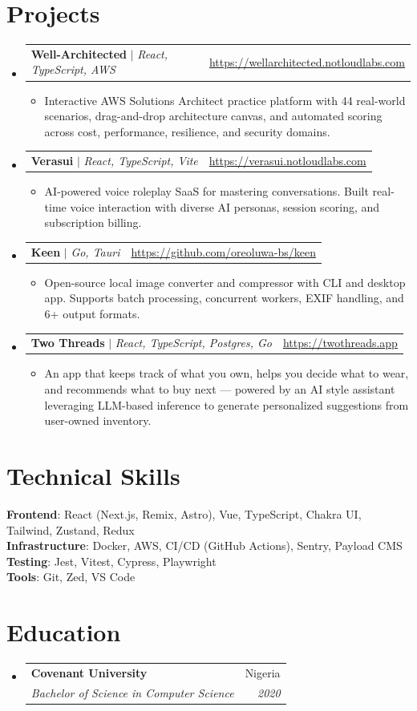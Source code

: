 \documentclass[letterpaper,11pt]{article}
\makeatletter
\newcommand{\resumeItem}[1]{
  \item\small{
    {#1 \vspace{-2pt}}
  }
}
\newcommand{\resumeSubheading}[4]{
  \vspace{-2pt}\item
    \begin{tabular*}{0.97\textwidth}[t]{l@{\extracolsep{\fill}}r}
      \textbf{#1} & #2 \\
      \textit{\small#3} & \textit{\small #4} \\
    \end{tabular*}\vspace{-7pt}
}
\newcommand{\resumeProjectHeading}[2]{
    \item
    \begin{tabular*}{0.97\textwidth}{l@{\extracolsep{\fill}}r}
      \small#1 & #2 \\
    \end{tabular*}\vspace{-7pt}
}
\newcommand{\resumeSubHeadingListStart}{\begin{itemize}[leftmargin=0.15in, label={}]}
\newcommand{\resumeSubHeadingListEnd}{\end{itemize}}
\newcommand{\resumeItemListStart}{\begin{itemize}}
\newcommand{\resumeItemListEnd}{\end{itemize}\vspace{-5pt}}
\makeatother
\begin{document}
  \section{Projects}
      \resumeSubHeadingListStart
        \resumeProjectHeading
            {\textbf{Well-Architected} $|$ \emph{React, TypeScript, AWS}}{\url{https://wellarchitected.notloudlabs.com}}
            \resumeItemListStart
              \resumeItem{Interactive AWS Solutions Architect practice platform with 44 real-world scenarios, drag-and-drop architecture canvas, and automated scoring across cost, performance, resilience, and security domains.}
            \resumeItemListEnd
        \resumeProjectHeading
            {\textbf{Verasui} $|$ \emph{React, TypeScript, Vite}}{\url{https://verasui.notloudlabs.com}}
            \resumeItemListStart
              \resumeItem{AI-powered voice roleplay SaaS for mastering conversations. Built real-time voice interaction with diverse AI personas, session scoring, and subscription billing.}
            \resumeItemListEnd
        \resumeProjectHeading
            {\textbf{Keen} $|$ \emph{Go, Tauri}}{\url{https://github.com/oreoluwa-bs/keen}}
            \resumeItemListStart
              \resumeItem{Open-source local image converter and compressor with CLI and desktop app. Supports batch processing, concurrent workers, EXIF handling, and 6+ output formats.}
            \resumeItemListEnd
        \resumeProjectHeading
            {\textbf{Two Threads} $|$ \emph{React, TypeScript, Postgres, Go}}{\url{https://twothreads.app}}
            \resumeItemListStart
              \resumeItem{An app that keeps track of what you own, helps you decide what to wear, and recommends what to buy next — powered by an AI style assistant leveraging LLM-based inference to generate personalized suggestions from user-owned inventory.}
            \resumeItemListEnd
      \resumeSubHeadingListEnd



\section{Technical Skills}
 \begin{itemize}[leftmargin=0.15in, label={}]
    \small{\item{
     \textbf{Frontend}{: React (Next.js, Remix, Astro), Vue, TypeScript, Chakra UI, Tailwind, Zustand, Redux} \\
     \textbf{Infrastructure}{: Docker, AWS, CI/CD (GitHub Actions), Sentry, Payload CMS} \\
     \textbf{Testing}{: Jest, Vitest, Cypress, Playwright} \\
     \textbf{Tools}{: Git, Zed, VS Code} \\
    }}
 \end{itemize}


\section{Education}
\resumeSubHeadingListStart
    \resumeSubheading
    {Covenant University}{Nigeria}
    {Bachelor of Science in Computer Science}{2020}
\resumeSubHeadingListEnd


\end{document}
